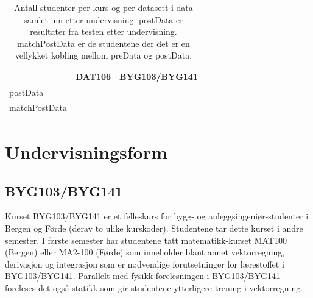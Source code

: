 \documentclass[a4paper,norsk,12pt]{report}
\begin{document}
\begin{table}[tp]
\begin{tabularx}{\textwidth}{|*{3}{Y|}}
\hline
& DAT106 & BYG103/BYG141 \\
\hline
postData & & \\
\hline
matchPostData & &  \\
\hline
\end{tabularx}
\caption{Antall studenter per kurs og per datasett i data samlet inn etter undervisning. postData er resultater fra testen etter undervisning. matchPostData er de studentene der det er en vellykket kobling mellom preData og postData.}
\label{tab:postdata}
\end{table}

\section{Undervisningsform}
\subsection{BYG103/BYG141}
Kurset BYG103/BYG141 er et felleskurs for bygg- og anleggsingeniør-studenter i Bergen og Førde (derav to ulike kurskoder). Studentene tar dette kurset i andre semester. I første semester har studentene tatt matematikk-kurset MAT100 (Bergen) eller MA2-100 (Førde) som inneholder blant annet vektorregning, derivasjon og integrasjon som er nødvendige forutsetninger for lærestoffet i BYG103/BYG141. Parallelt med fysikk-forelesningen i BYG103/BYG141 foreleses det også statikk som gir studentene ytterligere trening i vektorregning.
\end{document}
